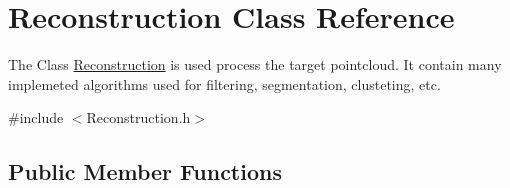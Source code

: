\hypertarget{classReconstruction}{}\section{Reconstruction Class Reference}
\label{classReconstruction}


The Class \hyperlink{classReconstruction}{Reconstruction} is used process the target pointcloud. It contain many implemeted algorithms used for filtering, segmentation, clusteting, etc.  




{\ttfamily \#include $<$Reconstruction.\+h$>$}

\subsection*{Public Member Functions}

